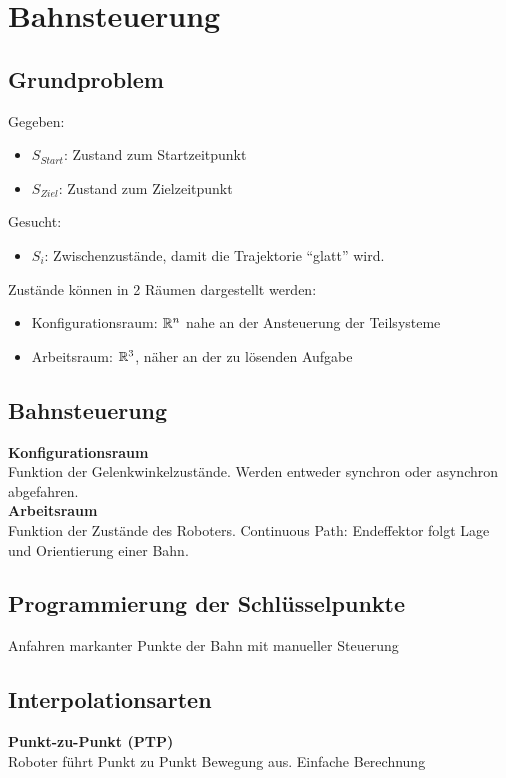 

\section{Bahnsteuerung}

\subsection{Grundproblem}
Gegeben:
\begin{itemize}
\item \(S_{\mathit{Start}}\): Zustand zum Startzeitpunkt
\item \(S_{\mathit{Ziel}}\): Zustand zum Zielzeitpunkt
\end{itemize}
Gesucht:
\begin{itemize}
\item \(S_i\): Zwischenzustände, damit die Trajektorie \enquote{glatt} wird.
\end{itemize}

Zustände können in 2 Räumen dargestellt werden:
\begin{itemize}
\item Konfigurationsraum: \(\mathbb{R}^n\) nahe an der Ansteuerung der Teilsysteme
\item Arbeitsraum: \(\mathbb{R}^3\), \SE näher an der zu lösenden Aufgabe
\end{itemize}


\subsection{Bahnsteuerung}
\textbf{Konfigurationsraum}\\
Funktion der Gelenkwinkelzustände. Werden entweder synchron oder asynchron abgefahren.\\

\textbf{Arbeitsraum}\\
Funktion der Zustände des Roboters. Continuous Path: Endeffektor folgt Lage und Orientierung einer Bahn.\\



\subsection{Programmierung der Schlüsselpunkte}
Anfahren markanter Punkte der Bahn mit manueller Steuerung


\subsection{Interpolationsarten}
\textbf{Punkt-zu-Punkt (PTP)}\\
Roboter führt Punkt zu Punkt Bewegung aus. Einfache Berechnung\\

